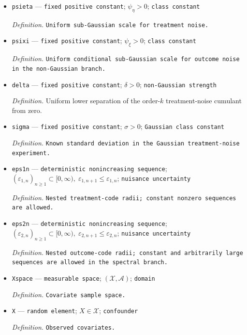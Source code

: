 \documentclass{article}
\begin{document}
\begin{itemize}
  \item \texttt{psieta} --- \texttt{fixed positive constant}; \(\psi_{\eta}>0\); \texttt{class constant}
  \par\smallskip\noindent\emph{Definition.} \texttt{Uniform sub-\allowbreak{}Gaussian scale for treatment noise.}
  \item \texttt{psixi} --- \texttt{fixed positive constant}; \(\psi_{\xi}>0\); \texttt{class constant}
  \par\smallskip\noindent\emph{Definition.} \texttt{Uniform conditional sub-\allowbreak{}Gaussian scale for outcome noise in the non-\allowbreak{}Gaussian branch.}
  \item \texttt{delta} --- \texttt{fixed positive constant}; \(\delta>0\); \texttt{non-\allowbreak{}Gaussian strength}
  \par\smallskip\noindent\emph{Definition.} Uniform lower separation of the order-\(k\) treatment-noise cumulant from zero.
  \item \texttt{sigma} --- \texttt{fixed positive constant}; \(\sigma>0\); \texttt{Gaussian class constant}
  \par\smallskip\noindent\emph{Definition.} \texttt{Known standard deviation in the Gaussian treatment-\allowbreak{}noise experiment.}
  \item \texttt{eps1n} --- \texttt{deterministic nonincreasing sequence}; \((\varepsilon_{1,n})_{n\ge1}\subset[0,\infty),\;\varepsilon_{1,n+1}\le\varepsilon_{1,n}\); \texttt{nuisance uncertainty}
  \par\smallskip\noindent\emph{Definition.} \texttt{Nested treatment-\allowbreak{}code radii;\allowbreak{} constant nonzero sequences are allowed.}
  \item \texttt{eps2n} --- \texttt{deterministic nonincreasing sequence}; \((\varepsilon_{2,n})_{n\ge1}\subset[0,\infty),\;\varepsilon_{2,n+1}\le\varepsilon_{2,n}\); \texttt{nuisance uncertainty}
  \par\smallskip\noindent\emph{Definition.} \texttt{Nested outcome-\allowbreak{}code radii;\allowbreak{} constant and arbitrarily large sequences are allowed in the spectral branch.}
  \item \texttt{Xspace} --- \texttt{measurable space}; \((\mathcal X,\mathcal A)\); \texttt{domain}
  \par\smallskip\noindent\emph{Definition.} \texttt{Covariate sample space.}
  \item \texttt{X} --- \texttt{random element}; \(X\in\mathcal X\); \texttt{confounder}
  \par\smallskip\noindent\emph{Definition.} \texttt{Observed covariates.}

\end{itemize}
\end{document}
